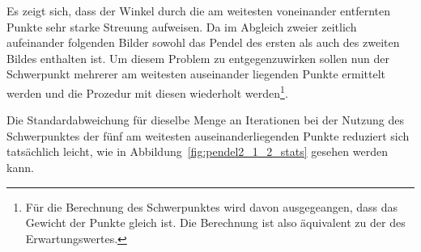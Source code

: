 Es zeigt sich, dass der Winkel durch die am weitesten voneinander entfernten Punkte sehr starke Streuung aufweisen.
Da im Abgleich zweier zeitlich aufeinander folgenden Bilder sowohl das Pendel des ersten als auch des zweiten Bildes enthalten ist.
Um diesem Problem zu entgegenzuwirken sollen nun der Schwerpunkt mehrerer am weitesten auseinander liegenden Punkte ermittelt werden und die Prozedur mit diesen wiederholt werden\footnote{Für die Berechnung des Schwerpunktes wird davon ausgegeangen, dass das Gewicht der Punkte gleich ist. Die Berechnung ist also äquivalent zu der des Erwartungswertes.}.

Die Standardabweichung für dieselbe Menge an Iterationen bei der Nutzung des Schwerpunktes der fünf am weitesten auseinanderliegenden Punkte reduziert sich tatsächlich leicht, wie in Abbildung~\ref{fig:pendel2_1_2_stats} gesehen werden kann.

